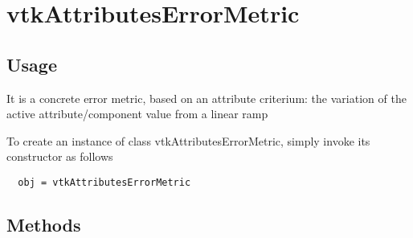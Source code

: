 \section{vtkAttributesErrorMetric}

\subsection{Usage}

 It is a concrete error metric, based on an attribute criterium:
 the variation of the active attribute/component value from a linear ramp


To create an instance of class vtkAttributesErrorMetric, simply
invoke its constructor as follows
\begin{verbatim}
  obj = vtkAttributesErrorMetric
\end{verbatim}
\subsection{Methods}

